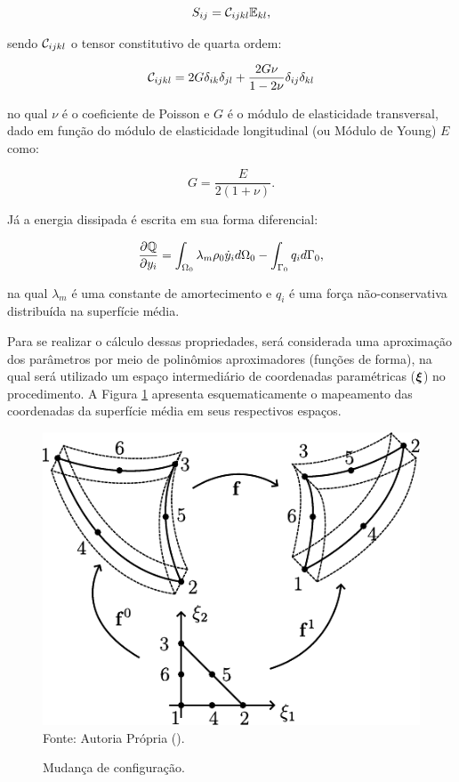 \begin{equation}
    S_{ij}=\mathcal{C}_{ijkl}\mathbb{E}_{kl}\text{,}
    \label{eq:CSD-S}
\end{equation}

\noindent sendo $\mathcal{C}_{ijkl}$ o tensor constitutivo de quarta ordem:

\begin{equation}
    \mathcal{C}_{ijkl}=2G\delta_{ik}\delta_{jl}+\frac{2G\nu}{1-2\nu}\delta_{ij}\delta_{kl}
\end{equation}

\noindent no qual $\nu$ é o coeficiente de Poisson e $G$ é o módulo de elasticidade transversal, dado em função do módulo de elasticidade longitudinal (ou Módulo de Young) $E$ como:

\begin{equation}
    G=\frac{E}{2(1+\nu)}\text{.}
\end{equation}

Já a energia dissipada é escrita em sua forma diferencial:

\begin{equation}
    \frac{\partial{\mathbb{Q}}}{\partial{y_i}}=\int_{\Omega_0}{\lambda_m\rho_0\dot{y}_i d\Omega_0}-\int_{\Gamma_0}{q_i d\Gamma_0}\text{,}
\end{equation}

\noindent na qual $\lambda_m$ é uma constante de amortecimento e $q_i$ é uma força não-conservativa distribuída na superfície média.

Para se realizar o cálculo dessas propriedades, será considerada uma aproximação dos parâmetros por meio de polinômios aproximadores (funções de forma), na qual será utilizado um espaço intermediário de coordenadas paramétricas ($\boldsymbol{\xi}$) no procedimento. A Figura \ref{fig:Mapeamento} apresenta esquematicamente o mapeamento das coordenadas da superfície média em seus respectivos espaços.

\begin{figure}[h!]
    \centering
    \caption{Mudança de configuração.}
    \includegraphics[width=.4\linewidth]{Figuras/Mapeamento.pdf}
    \\Fonte: Autoria Própria (\the\year).
    \label{fig:Mapeamento}
\end{figure}

